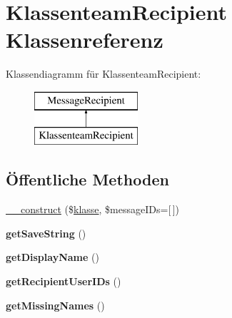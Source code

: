 \hypertarget{class_klassenteam_recipient}{}\section{Klassenteam\+Recipient Klassenreferenz}
\label{class_klassenteam_recipient}
Klassendiagramm für Klassenteam\+Recipient\+:\begin{figure}[H]
\begin{center}
\leavevmode
\includegraphics[height=2.000000cm]{class_klassenteam_recipient}
\end{center}
\end{figure}
\subsection*{Öffentliche Methoden}
\begin{DoxyCompactItemize}
\item 
\mbox{\hyperlink{class_klassenteam_recipient_af0771111ee73b88f71be5bfae95f33f7}{\+\_\+\+\_\+construct}} (\$\mbox{\hyperlink{classklasse}{klasse}}, \$message\+I\+Ds=\mbox{[}$\,$\mbox{]})
\item 
\mbox{\label{class_klassenteam_recipient_a0845729338dc5e38176112a91bb9c25b}} 
{\bfseries get\+Save\+String} ()
\item 
\mbox{\label{class_klassenteam_recipient_ae2c8a8374fb1faf242197f1c3653d496}} 
{\bfseries get\+Display\+Name} ()
\item 
\mbox{\label{class_klassenteam_recipient_ace57181c755ff162c2e5fc0299d580a8}} 
{\bfseries get\+Recipient\+User\+I\+Ds} ()
\item 
\mbox{\label{class_klassenteam_recipient_abea432d84529aa74198e28bd8aac2437}} 
{\bfseries get\+Missing\+Names} ()
\end{DoxyCompactItemize}
